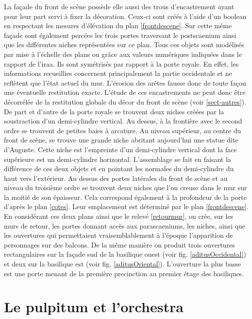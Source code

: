 La façade du front de scène possède elle aussi des trous d'encastrement ayant pour leur part servi à fixer la décoration. Ceux-ci sont créés à l'aide d'un \gls{boolean} en respectant les mesures d'élévation du plan \ref{frontdescene}. Sur cette même façade sont également percées les trois portes traversant le \gls{postscaenium} ainsi que les différentes niches représentées sur ce plan. Tous ces objets sont modélisés par mise à l'échelle des plans \cite{orangePl} ou grâce aux valeurs numériques indiquées dans le rapport de l'\gls{iraa}\cite[Chap. II]{orangeTxt}. Ils sont symétrisés par rapport à la porte royale. En effet, les informations recueillies concernent principalement la partie occidentale et ne reflètent que l'état actuel du mur. L'érosion des arêtes fausse donc de toute façon une éventuelle restitution exacte. L'étude de ces encastrements ne peut donc être décorrélée de la restitution globale du décor du front de scène (voir \ref{sect-autres}). De part et d'autre de la porte royale se trouvent deux niches créées par la soustraction d'un demi-cylindre vertical. Au dessus, à la frontière avec le second ordre se trouvent de petites baies à arcature. Au niveau supérieur, au centre du front de scène, se trouve une grande niche abritant aujourd'hui une statue dite d'Auguste. Cette niche est l'empreinte d'un demi-cylindre vertical dont la face supérieure est un demi-cylindre horizontal. L'assemblage se fait en faisant la différence de ces deux objets et en pointant les normales du demi-cylindre du haut vers l'extérieur. Au dessus des portes latérales du front de scène et au niveau du troisième ordre se trouvent deux niches que l'on creuse dans le mur sur la moitié de son épaisseur. Cela correspond également à la profondeur de la porte d'après le plan \ref{cotes}. Leur emplacement est déterminé par le plan \ref{frontdescene}. En considérant ces deux plans ainsi que le relevé \ref{retourmur}, on crée, sur les murs de retour, les portes donnant accès aux \glspl{parascaenium}, les niches, ainsi que les ouvertures qui permettaient vraisemblablement à l'époque l'apparition de personnages sur des balcons. De la même manière on produit trois ouvertures rectangulaires sur la façade sud de la \gls{basilique} ouest (voir fig. \ref{aditusOccidental}) et deux sur la \gls{basilique} est (voir fig. \ref{aditusOriental}). L'ouverture la plus basse est une porte menant de la première \gls{precinction} au premier étage des \glspl{basilique}.


\section{Le \gls{pulpitum} et l'\gls{orchestra}} 

